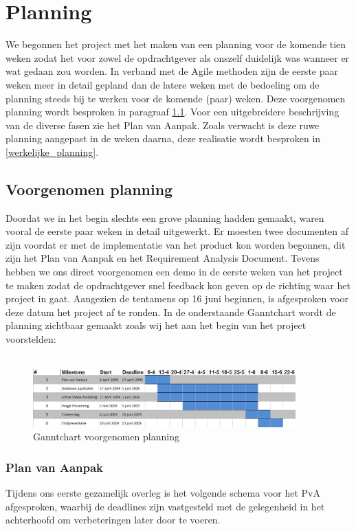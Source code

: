 \section{Planning}
\label{Planning}
We begonnen het project met het maken van een planning voor de komende tien
weken zodat het voor zowel de opdrachtgever als onszelf duidelijk was wanneer
er wat gedaan zou worden. In verband met de Agile methoden zijn de eerste paar
weken meer in detail gepland dan de latere weken met de bedoeling om de
planning steeds bij te werken voor de komende (paar) weken. Deze voorgenomen
planning wordt besproken in paragraaf \ref{voorgenomen_planning}. Voor een
uitgebreidere beschrijving van de diverse fasen zie het Plan van Aanpak.
Zoals verwacht is deze ruwe planning aangepast in de
weken daarna, deze realisatie wordt besproken in \ref{werkelijke_planning}.

\subsection{Voorgenomen planning}
\label{voorgenomen_planning}
Doordat we in het begin slechts een grove planning hadden gemaakt, waren vooral
de eerste paar weken in detail uitgewerkt.
Er moesten twee documenten af zijn voordat er met de implementatie van het product kon worden begonnen, dit zijn het Plan van Aanpak en het Requirement Analysis Document.
Tevens hebben we ons direct voorgenomen een demo in de eerste weken van het project te maken zodat de opdrachtgever snel feedback kon geven op de richting waar het project in gaat.
Aangezien de tentamens op 16 juni beginnen, is afgesproken voor deze datum het project af te ronden.
In de onderstaande Ganntchart wordt de planning zichtbaar gemaakt zoals wij het aan het begin van het project voorstelden:
\\
\\
\begin{figure}[ht]
\includegraphics[width=0.9\textwidth]{ganntbefore}
\caption{Ganntchart voorgenomen planning}
\label{fig:ganntbefore}
\end{figure}

\subsubsection{Plan van Aanpak}
Tijdens ons eerste gezamelijk overleg is het volgende schema voor het PvA
afgesproken, waarbij de deadlines zijn vastgesteld met de gelegenheid in het achterhoofd om verbeteringen later door te voeren.

